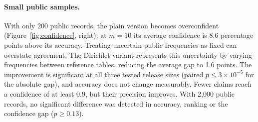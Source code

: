 \paragraph{Small public samples.} With only 200 public records, the plain version becomes
  overconfident (Figure~\ref{fig:confidence}, right): at $m=10$ its average confidence is 8.6
  percentage points above its accuracy. Treating uncertain public frequencies as fixed can overstate agreement. The Dirichlet
  variant represents this uncertainty by varying frequencies between reference tables,
  reducing the average gap to 1.6 points.
  The improvement is significant at all three tested release sizes (paired
  $p\leq3\times10^{-5}$ for the absolute gap), and accuracy does not change measurably. Fewer claims reach a confidence of at least 0.9, but their precision improves. With 2,000 public
  records, no significant difference was detected in accuracy, ranking or the confidence
  gap ($p\geq0.13$).
